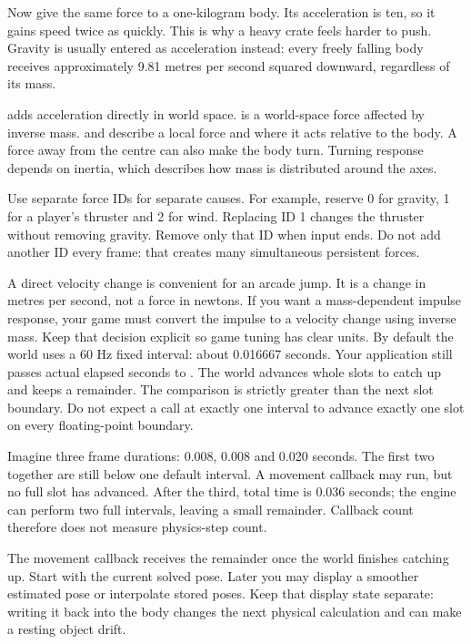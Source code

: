\documentclass[11pt,a4paper]{article}
\begin{document}
Now give the same force to a one-kilogram body. Its acceleration is ten, so it gains speed twice as quickly. This is why a heavy crate feels harder to push. Gravity is usually entered as acceleration instead: every freely falling body receives approximately 9.81 metres per second squared downward, regardless of its mass.

 adds acceleration directly in world space.  is a world-space force affected by inverse mass.  and  describe a local force and where it acts relative to the body. A force away from the centre can also make the body turn. Turning response depends on inertia, which describes how mass is distributed around the axes.

Use separate force IDs for separate causes. For example, reserve 0 for gravity, 1 for a player's thruster and 2 for wind. Replacing ID 1 changes the thruster without removing gravity. Remove only that ID when input ends. Do not add another ID every frame: that creates many simultaneous persistent forces.

A direct velocity change is convenient for an arcade jump. It is a change in metres per second, not a force in newtons. If you want a mass-dependent impulse response, your game must convert the impulse to a velocity change using inverse mass. Keep that decision explicit so game tuning has clear units.
By default the world uses a 60 Hz fixed interval: about 0.016667 seconds. Your application still passes actual elapsed seconds to . The world advances whole slots to catch up and keeps a remainder. The comparison is strictly greater than the next slot boundary. Do not expect a call at exactly one interval to advance exactly one slot on every floating-point boundary.

Imagine three frame durations: 0.008, 0.008 and 0.020 seconds. The first two together are still below one default interval. A movement callback may run, but no full slot has advanced. After the third, total time is 0.036 seconds; the engine can perform two full intervals, leaving a small remainder. Callback count therefore does not measure physics-step count.

The movement callback receives the remainder once the world finishes catching up. Start with the current solved pose. Later you may display a smoother estimated pose or interpolate stored poses. Keep that display state separate: writing it back into the body changes the next physical calculation and can make a resting object drift.
\end{document}
